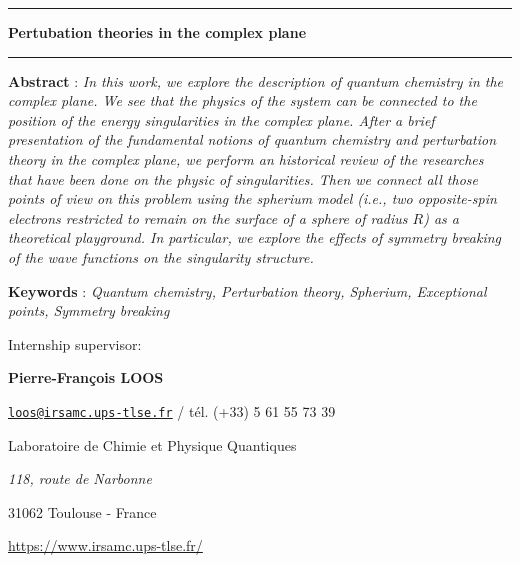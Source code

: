 \documentclass[11pt,a4paper]{article}
\begin{document}
\begin{center}

\vspace{1.5cm}

\rule[11pt]{5cm}{0.5pt}

\textbf{\huge Pertubation theories in the complex plane}

\rule{5cm}{0.5pt}

\vspace{1.5cm}

\parbox{15cm}{\small
\textbf{Abstract} : \it In this work, we explore the description of quantum chemistry in the complex plane. We see that the physics of the system can be connected to the position of the energy singularities in the complex plane. After a brief presentation of the fundamental notions of quantum chemistry and perturbation theory in the complex plane, we perform an historical review of the researches that have been done on the physic of singularities. Then we connect all those points of view on this problem using the spherium model (i.e., two opposite-spin electrons restricted to remain on the surface of a sphere of radius $R$) as a theoretical playground. In particular, we explore the effects of symmetry breaking of the wave functions on the singularity structure.
}

\vspace{0.5cm}

\parbox{15cm}{
\textbf{Keywords} : \it Quantum chemistry, Perturbation theory,  Spherium, Exceptional points, Symmetry breaking
} %

\vspace{0.5cm}

\parbox{15cm}{
Internship supervisor:

{\bf Pierre-François \textsc{LOOS}}

\href{mailto:loos@irsamc.ups-tlse.fr}{\tt loos@irsamc.ups-tlse.fr} / tél. (+33) 5 61 55 73 39

Laboratoire de Chimie et Physique Quantiques

{\it 118, route de Narbonne

31062 Toulouse - France}

\url{https://www.irsamc.ups-tlse.fr/}
} %


\end{center}
\end{document}
